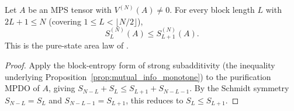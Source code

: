 \begin{proposition}\label{prop:pure_area_monotone}
    \leanok
    Let $A$ be an MPS tensor with $V^{(N)}(A)\neq 0$. For every block length $L$
    with $2L+1\le N$ (covering $1\le L<\lfloor N/2\rfloor$),
    \[
        S_L^{(N)}(A) \le S_{L+1}^{(N)}(A).
    \]
    This is the pure-state area law of \cite[Section~3, line~599]{Cirac2016MPDO_arXiv}.
\end{proposition}
\begin{proof}\leanok
    Apply the block-entropy form of strong subadditivity (the inequality
    underlying Proposition~\ref{prop:mutual_info_monotone}) to the purification
    MPDO of $A$, giving $S_{N-L} + S_L \le S_{L+1} + S_{N-L-1}$. By the Schmidt
    symmetry $S_{N-L} = S_L$ and $S_{N-L-1} = S_{L+1}$, this reduces to
    $S_L \le S_{L+1}$.
\end{proof}

